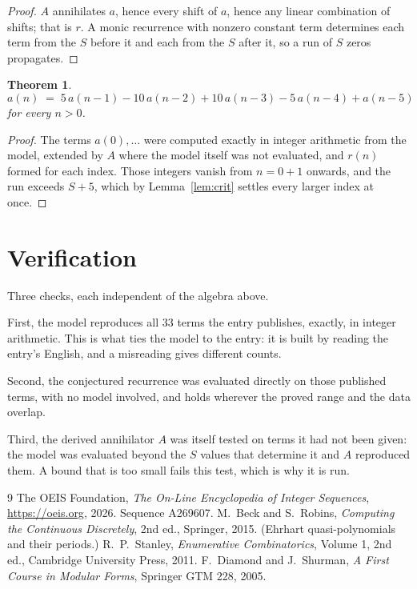 \documentclass[11pt,a4paper]{article}
\theoremstyle{plain}
\newtheorem{theorem}{Theorem}
\theoremstyle{definition}
\begin{document}
\begin{proof}
$A$ annihilates $a$, hence every shift of $a$, hence any linear combination of shifts; that is
$r$. A monic recurrence with nonzero constant term determines each term from the $S$ before it
and each from the $S$ after it, so a run of $S$ zeros propagates.
\end{proof}

\begin{theorem}
\[
a(n)\;=\;5\,a(n-1) - 10\,a(n-2) + 10\,a(n-3) - 5\,a(n-4) + a(n-5)
\]
for every $n>0$.
\end{theorem}

\begin{proof}
The terms $a(0),\dots$ were computed exactly in integer arithmetic from the model, extended by
$A$ where the model itself was not evaluated, and $r(n)$ formed for each index. Those integers
vanish from $n=0+1$ onwards, and the run exceeds $S+5$, which by
Lemma~\ref{lem:crit} settles every larger index at once.
\end{proof}

\section{Verification}

Three checks, each independent of the algebra above.

First, the model reproduces all $33$ terms the entry publishes, exactly, in integer
arithmetic. This is what ties the model to the entry: it is built by reading the entry's
English, and a misreading gives different counts.

Second, the conjectured recurrence was evaluated directly on those published terms, with no
model involved, and holds wherever the proved range and the data overlap.

Third, the derived annihilator $A$ was itself tested on terms it had not been given: the model
was evaluated beyond the $S$ values that determine it and $A$ reproduced them. A bound that is
too small fails this test, which is why it is run.

\begin{thebibliography}{9}
 The OEIS Foundation, \emph{The On-Line Encyclopedia of Integer
Sequences}, \url{https://oeis.org}, 2026. Sequence A269607.
 M.~Beck and S.~Robins, \emph{Computing the Continuous Discretely},
2nd ed., Springer, 2015. (Ehrhart quasi-polynomials and their periods.)
 R.~P.~Stanley, \emph{Enumerative Combinatorics}, Volume 1, 2nd ed.,
Cambridge University Press, 2011.
 F.~Diamond and J.~Shurman, \emph{A First Course in Modular Forms},
Springer GTM 228, 2005.
\end{thebibliography}
\end{document}
